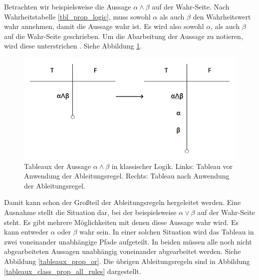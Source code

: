 Betrachten wir beispielsweise die Aussage $\alpha\wedge\beta$ auf der Wahr-Seite. Nach Wahrheitstabelle \ref{tbl_prop_logic}, muss sowohl $\alpha$ als auch $\beta$ den Wahrheitswert wahr annehmen, damit die Aussage wahr ist. Es wird also sowohl $\alpha$, als auch $\beta$ auf die Wahr-Seite geschrieben. Um die Abarbeitung der Aussage zu notieren, wird diese unterstrichen \cite{KB14}. Siehe Abbildung \ref{tableaux_prop_and}.

\begin{figure}[h]
\begin{center}
\includegraphics[scale=0.7]{images/Tableaux_And_Prop_Logic.png}
\caption{Tableaux der Aussage $\alpha\wedge\beta$ in klassischer Logik. Links: Tableau vor Anwendung der Ableitungsregel. Rechts: Tableau nach Anwendung der Ableitungsregel.}
\label{tableaux_prop_and}
\end{center}
\end{figure}

Damit kann schon der Großteil der Ableitungsregeln hergeleitet werden. Eine Ausnahme stellt die Situation dar, bei der beispielsweise $\alpha\vee\beta$ auf der Wahr-Seite steht. Es gibt mehrere Möglichkeiten mit denen diese Aussage wahr wird. Es kann entweder $\alpha$ oder $\beta$ wahr sein. In einer solchen Situation wird das Tableau in zwei voneinander unabhängige Pfade aufgeteilt. In beiden müssen alle noch nicht abgearbeiteten Aussagen unabhängig voneinander abgearbeitet werden. Siehe Abbildung \ref{tableaux_prop_or}. Die übrigen Ableitungsregeln sind in Abbildung \ref{tableaux_class_prop_all_rules} dargestellt.

